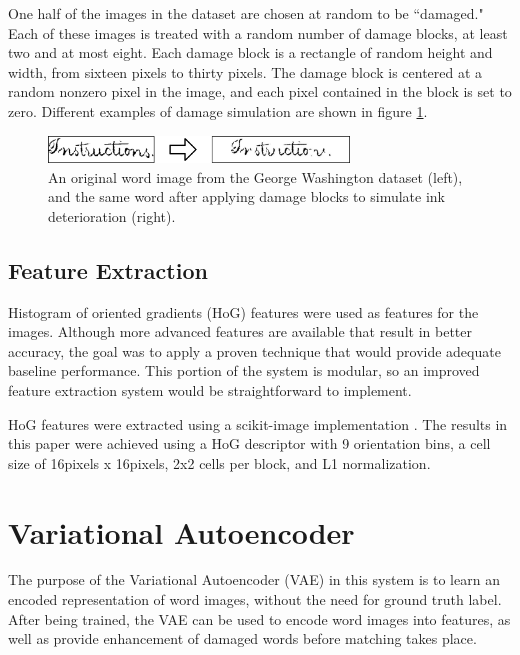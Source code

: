 \documentclass[final]{ukthesis}
\begin{document}
One half of the images in the dataset are chosen at random to be ``damaged." Each of these images is treated with a random number of damage blocks, at least two and at most eight. Each damage block is a rectangle of random height and width, from sixteen pixels to thirty pixels. The damage block is centered at a random nonzero pixel in the image, and each pixel contained in the block is set to zero. Different examples of damage simulation are shown in figure \ref{fig:damage-simulation}.

\begin{figure}[h]
\begin{center}
\includegraphics[width=8cm]{damage-simulation}
\end{center}
\caption{An original word image from the George Washington dataset (left), and the same word after applying damage blocks to simulate ink deterioration (right).}
\label{fig:damage-simulation}
\end{figure}


\subsection{Feature Extraction}
Histogram of oriented gradients (HoG) features were used as features for the images. Although more advanced features are available that result in better accuracy, the goal was to apply a proven technique that would provide adequate baseline performance. This portion of the system is modular, so an improved feature extraction system would be straightforward to implement.

HoG features were extracted using a scikit-image implementation \cite{van2014scikit}. The results in this paper were achieved using a HoG descriptor with 9 orientation bins, a cell size of 16pixels x 16pixels, 2x2 cells per block, and L1 normalization.



%
%
\section{Variational Autoencoder}
\label{sec:vae}

The purpose of the Variational Autoencoder (VAE) \cite{kingma2013auto} in this system is to learn an encoded representation of word images, without the need for ground truth label. After being trained, the VAE can be used to encode word images into features, as well as provide enhancement of damaged words before matching takes place.
\end{document}
